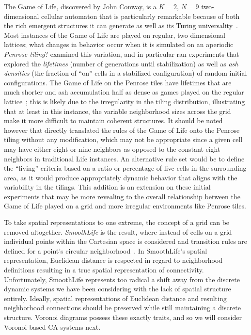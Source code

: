 \documentclass[a4paper,11pt]{report}
\begin{document}
The Game of Life, discovered by John Conway, is a $K=2$, $N=9$ two-dimensional cellular automaton that is particularly remarkable because of both the rich emergent structures it can generate as well as its Turing universality~\cite{ga70}. Most instances of the Game of Life are played on regular, two dimensional lattices; what changes in behavior occur when it is simulated on an aperiodic \textit{Penrose tiling}? \citeauthor{hi05} examined this variation, and in particular ran experiments that explored the \textit{lifetimes} (number of generations until stabilization) as well as  \textit{ash densities} (the fraction of ``on'' cells in a stabilized configuration) of random initial configurations. The Game of Life on the Penrose tiles have lifetimes that are much shorter and ash accumulation half as dense as games played on the regular lattice~\cite{hi05}; this is likely due to the irregularity in the tiling distribution, illustrating that at least in this instance, the variable neighborhood sizes across the grid make it more difficult to maintain coherent structures. It should be noted however that \citeauthor{hi05} directly translated the rules of the Game of Life onto the Penrose tiling without any modification, which may not be appropriate since a given cell may have either eight or nine neighbors as opposed to the constant eight neighbors in traditional Life instances. An alternative rule set would be to define the ``living'' criteria based on a ratio or percentage of live cells in the surrounding area, as it would produce appropriately dynamic behavior that aligns with the variability in the tilings. This addition is an extension on these initial experiments that may be more revealing to the overall relationship between the Game of Life played on a grid and more irregular environments like Penrose tiles. 

To take spatial representations to one extreme, the concept of a grid can be removed altogether. \textit{SmoothLife} is the result, where instead of cells on a grid individual points within the Cartesian space is considered and transition rules are defined for a point's circular neighborhood~\cite{ra11}. In SmoothLife's spatial representation, Euclidean distance is respected in regard to neighborhood definitions resulting in a true spatial representation of connectivity. Unfortunately, SmoothLife represents too radical a shift away from the discrete dynamic systems we have been considering with the lack of spatial structure entirely. Ideally, spatial representations of Euclidean distance and resulting neighborhood connections should be preserved while still maintaining a discrete structure. Voronoi diagrams possess these exactly traits, and so we will consider Voronoi-based CA systems next.
\end{document}
